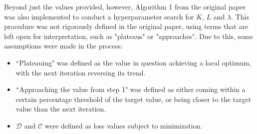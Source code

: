 Beyond just the values provided, however, Algorithm 1 from the original paper was also implemented to conduct a hyperparameter search for $K$, $L$ and $\lambda$. This procedure was not rigorously defined in the original paper, using terms that are left open for interpretation, such as "plateaus" or "approaches". Due to this, some assumptions were made in the process:
\begin{itemize}
    \item ``Plateauing" was defined as the value in question achieving a local optimum, with the next iteration reversing its trend.
    \item ``Approaching the value from step 1" was defined as either coming within a certain percentage threshold of the target value, or being closer to the target value than the next iteration.
    \item $\mathcal{D}$ and $\mathcal{C}$ were defined as loss values subject to minimization.
\end{itemize}

